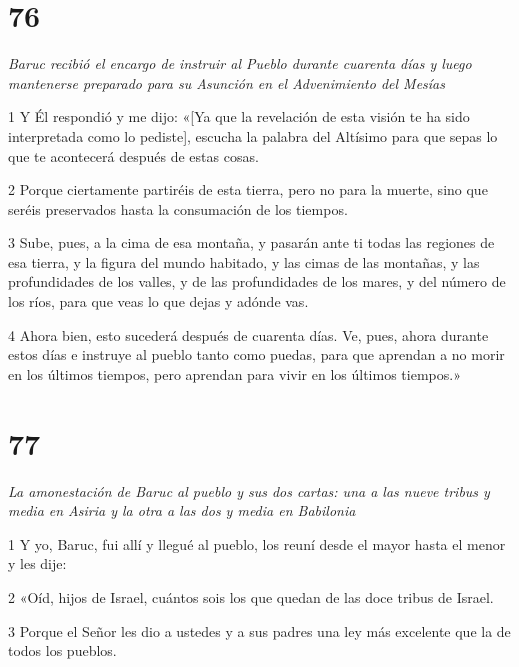 \chapter{76}

\par \textit{Baruc recibió el encargo de instruir al Pueblo durante cuarenta días y luego mantenerse preparado para su Asunción en el Advenimiento del Mesías}

\par 1 Y Él respondió y me dijo: «[Ya que la revelación de esta visión te ha sido interpretada como lo pediste], escucha la palabra del Altísimo para que sepas lo que te acontecerá después de estas cosas.

\par 2 Porque ciertamente partiréis de esta tierra, pero no para la muerte, sino que seréis preservados hasta la consumación de los tiempos.

\par 3 Sube, pues, a la cima de esa montaña, y pasarán ante ti todas las regiones de esa tierra, y la figura del mundo habitado, y las cimas de las montañas, y las profundidades de los valles, y de las profundidades de los mares, y del número de los ríos, para que veas lo que dejas y adónde vas.

\par 4 Ahora bien, esto sucederá después de cuarenta días. Ve, pues, ahora durante estos días e instruye al pueblo tanto como puedas, para que aprendan a no morir en los últimos tiempos, pero aprendan para vivir en los últimos tiempos.»

\chapter{77}

\par \textit{La amonestación de Baruc al pueblo y sus dos cartas: una a las nueve tribus y media en Asiria y la otra a las dos y media en Babilonia}


\par 1 Y yo, Baruc, fui allí y llegué al pueblo, los reuní desde el mayor hasta el menor y les dije:

\par 2 «Oíd, hijos de Israel, cuántos sois los que quedan de las doce tribus de Israel.

\par 3 Porque el Señor les dio a ustedes y a sus padres una ley más excelente que la de todos los pueblos.

